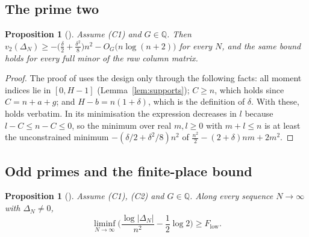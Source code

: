 \documentclass[11pt]{article}
\newtheorem{proposition}[theorem]{Proposition}
\theoremstyle{definition}
\begin{document}
\subsection{The prime two}\label{sec:two}

\begin{proposition}[{\cite[Prop.~2.2]{OAI}}]\label{prop:two}
Assume (C1) and $G\in\mathbb Q$. Then $v_2(\Delta_N)\ge-\big(\frac\delta2+\frac{\delta^2}8\big)n^2-O_G\big(n\log(n+2)\big)$ for every $N$, and the same bound holds for every full minor of the raw column matrix.
\end{proposition}

\begin{proof}
The proof of \cite[Prop.~2.2]{OAI} uses the design only through the following facts: all moment indices lie in $[0,H-1]$ (Lemma~\ref{lem:supports}); $C\ge n$, which holds since $C=n+a+g$; and $H-b=n(1+\delta)$, which is the definition of $\delta$. With these, \cite[Eq.~(30)]{OAI} holds verbatim. In its minimisation the expression decreases in $l$ because $l-C\le n-C\le0$, so the minimum over real $m,l\ge0$ with $m+l\le n$ is at least the unconstrained minimum $-(\delta/2+\delta^2/8)n^2$ of $\tfrac{n^2}{2}-(2+\delta)nm+2m^2$.
\end{proof}

\subsection{Odd primes and the finite-place bound}

\begin{proposition}[{\cite[Prop.~3.4]{OAI}}]\label{prop:low}
Assume (C1), (C2) and $G\in\mathbb Q$. Along every sequence $N\to\infty$ with $\Delta_N\ne0$,
\[
\liminf_{N\to\infty}\Big(\frac{\log|\Delta_N|}{n^2}-\frac12\log2\Big)\ge F_{\mathrm{low}}.
\]
\end{proposition}
\end{document}
